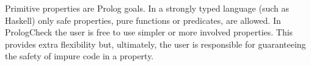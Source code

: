 \documentclass[runningheads,a4paper]{../../PaperStyles/llncs}
\makeatletter
\newcommand*{\aligncolumn}[2]%
  {\g@addto@macro\ColumnHook{\column{#1}{#2}}}
\let\hspre\empty
\let\hspost\empty
\newcommand{\yap}[1]{\lstinline[style=yap]{#1}}
\newcommand{\todo}[2][?]{\marginpar{\raggedright \tiny TODO: #2}}
\newcommand{\Prolog}[0]{{\sf Prolog}}
\newcommand{\Haskell}[0]{{\sf Haskell}}
\newcommand{\plqc}[0]{{\sf PrologCheck}}
\makeatother
\begin{document}
Primitive properties are \Prolog{} goals.
%
In a strongly typed language (such as \Haskell{}) only
safe properties, pure functions or predicates, are allowed.
%
In \plqc{} the user is free to use simpler or more involved properties.
%
This provides extra flexibility but, ultimately, the user is
responsible for guaranteeing the safety of impure code in a property.




\end{document}
